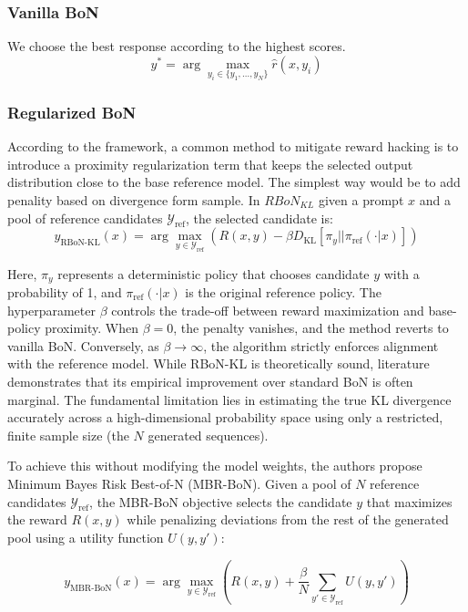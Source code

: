 \documentclass[a4paper,11pt]{article}
\begin{document}
\subsubsection{Vanilla BoN}
\label{sec:vanilla_bon}
We choose the best response according to the highest scores. $$y^* = \arg\max_{y_i \in \{y_1, \dots, y_N\}} \hat{r}(x, y_i)$$

\subsubsection{Regularized BoN}
According to the \cite{jinnai2024regularized} framework, a common method to mitigate reward hacking is to introduce a proximity regularization term that keeps the selected output distribution close to the base reference model. The simplest way would be to add penality based on divergence form sample. In $RBoN_{KL}$ given a prompt $x$ and a pool of reference candidates $\mathcal{Y}_{\text{ref}}$, the selected candidate is:
$$y_{\text{RBoN-KL}}(x) = \arg\max_{y \in \mathcal{Y}_{\text{ref}}} \left( R(x, y) - \beta D_{\text{KL}}[\pi_y || \pi_{\text{ref}}(\cdot|x)] \right)$$

Here, $\pi_y$ represents a deterministic policy that chooses candidate $y$ with a probability of 1, and $\pi_{\text{ref}}(\cdot|x)$ is the original reference policy. The hyperparameter $\beta$ controls the trade-off between reward maximization and base-policy proximity. When $\beta = 0$, the penalty vanishes, and the method reverts to vanilla BoN. Conversely, as $\beta \to \infty$, the algorithm strictly enforces alignment with the reference model. While RBoN-KL is theoretically sound, literature demonstrates that its empirical improvement over standard BoN is often marginal. The fundamental limitation lies in estimating the true KL divergence accurately across a high-dimensional probability space using only a restricted, finite sample size (the $N$ generated sequences). 

To achieve this without modifying the model weights, the authors propose Minimum Bayes Risk Best-of-N (MBR-BoN). Given a pool of $N$ reference candidates $\mathcal{Y}_{\text{ref}}$, the MBR-BoN objective selects the candidate $y$ that maximizes the reward $R(x, y)$ while penalizing deviations from the rest of the generated pool using a utility function $U(y, y')$:

\begin{equation}
y_{\text{MBR-BoN}}(x) = \arg\max_{y \in \mathcal{Y}_{\text{ref}}} \left( R(x, y) + \frac{\beta}{N} \sum_{y' \in \mathcal{Y}_{\text{ref}}} U(y, y') \right)
\end{equation}
\end{document}
